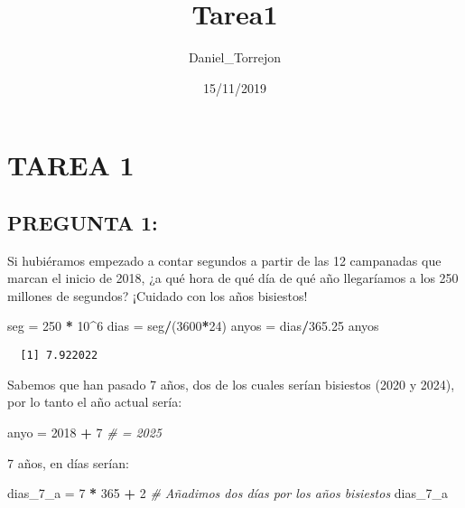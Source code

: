 \documentclass[]{article}
\title{Tarea1}
\author{Daniel\_Torrejon}
\date{15/11/2019}
\newenvironment{Shaded}{\begin{snugshade}}{\end{snugshade}}
\newcommand{\CommentTok}[1]{\textcolor[rgb]{0.56,0.35,0.01}{\textit{#1}}}
\newcommand{\DecValTok}[1]{\textcolor[rgb]{0.00,0.00,0.81}{#1}}
\newcommand{\FloatTok}[1]{\textcolor[rgb]{0.00,0.00,0.81}{#1}}
\newcommand{\NormalTok}[1]{#1}
\newcommand{\OperatorTok}[1]{\textcolor[rgb]{0.81,0.36,0.00}{\textbf{#1}}}
\newcommand{\StringTok}[1]{\textcolor[rgb]{0.31,0.60,0.02}{#1}}
\begin{document}
\maketitle

\hypertarget{tarea-1}{%
\section{TAREA 1}\label{tarea-1}}

\hypertarget{pregunta-1}{%
\subsection{PREGUNTA 1:}\label{pregunta-1}}

Si hubiéramos empezado a contar segundos a partir de las 12 campanadas
que marcan el inicio de 2018, ¿a qué hora de qué día de qué año
llegaríamos a los 250 millones de segundos? ¡Cuidado con los años
bisiestos!

\begin{Shaded}
\begin{Highlighting}[]
\NormalTok{seg =}\StringTok{ }\DecValTok{250} \OperatorTok{*}\StringTok{ }\DecValTok{10}\OperatorTok{^}\DecValTok{6}
\NormalTok{dias =}\StringTok{ }\NormalTok{seg}\OperatorTok{/}\NormalTok{(}\DecValTok{3600}\OperatorTok{*}\DecValTok{24}\NormalTok{)}
\NormalTok{anyos =}\StringTok{ }\NormalTok{dias}\OperatorTok{/}\FloatTok{365.25}
\NormalTok{anyos}
\end{Highlighting}
\end{Shaded}

\begin{verbatim}
  [1] 7.922022
\end{verbatim}

Sabemos que han pasado 7 años, dos de los cuales serían bisiestos (2020
y 2024), por lo tanto el año actual sería:

\begin{Shaded}
\begin{Highlighting}[]
\NormalTok{anyo =}\StringTok{ }\DecValTok{2018} \OperatorTok{+}\StringTok{ }\DecValTok{7} \CommentTok{# = 2025}
\end{Highlighting}
\end{Shaded}

7 años, en días serían:

\begin{Shaded}
\begin{Highlighting}[]
\NormalTok{dias_}\DecValTok{7}\NormalTok{_a =}\StringTok{ }\DecValTok{7} \OperatorTok{*}\StringTok{ }\DecValTok{365} \OperatorTok{+}\StringTok{ }\DecValTok{2} \CommentTok{# Añadimos dos días por los años bisiestos}
\NormalTok{dias_}\DecValTok{7}\NormalTok{_a}
\end{Highlighting}
\end{Shaded}
\end{document}
